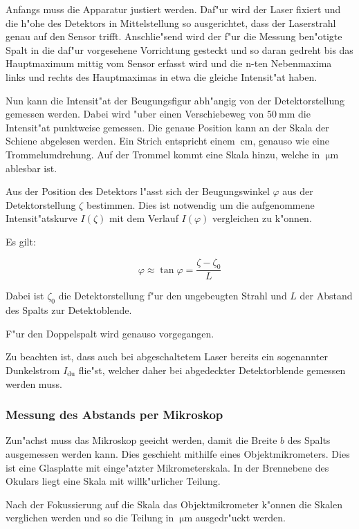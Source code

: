 			Anfangs muss die Apparatur justiert werden. Daf"ur wird der Laser fixiert und die h"ohe des Detektors in Mittelstellung so ausgerichtet, dass der Laserstrahl genau auf den Sensor trifft. Anschlie"send wird der f"ur die Messung ben"otigte Spalt in die daf"ur vorgesehene Vorrichtung gesteckt und so daran gedreht bis das Hauptmaximum mittig vom Sensor erfasst wird und die n-ten Nebenmaxima links und rechts des Hauptmaximas in etwa die gleiche Intensit"at haben.

			Nun kann die Intensit"at der Beugungsfigur abh"angig von der Detektorstellung gemessen werden. Dabei wird "uber einen Verschiebeweg von $\SI{50}{\milli\meter}$ die Intensit"at punktweise gemessen. Die genaue Position kann an der Skala der Schiene abgelesen werden. Ein Strich entspricht einem $\SI{}{\centi \meter}$, genauso wie eine Trommelumdrehung. Auf der Trommel kommt eine Skala hinzu, welche in $\SI{}{\micro \meter}$ ablesbar ist.

			Aus der Position des Detektors l"asst sich der Beugungswinkel $\varphi$ aus der Detektorstellung $\zeta$ bestimmen. Dies ist notwendig um die aufgenommene Intensit"atskurve $I(\zeta)$ mit dem Verlauf $I(\varphi)$ vergleichen zu k"onnen.

			Es gilt:

			\begin{equation}
				\varphi \approx \tan{\varphi} = \frac{\zeta - \zeta_0}{L}
			\end{equation}

			Dabei ist $\zeta_0$ die Detektorstellung f"ur den ungebeugten Strahl und $L$ der Abstand des Spalts zur Detektoblende.

			F"ur den Doppelspalt wird genauso vorgegangen.

			Zu beachten ist, dass auch bei abgeschaltetem Laser bereits ein sogenannter Dunkelstrom $I_{\text{du}}$ flie"st, welcher daher bei abgedeckter Detektorblende gemessen werden muss.

		\subsubsection{Messung des Abstands per Mikroskop}
			\label{sec:messung_mikro}

			Zun"achst muss das Mikroskop geeicht werden, damit die Breite $b$ des Spalts ausgemessen werden kann. Dies geschieht mithilfe eines Objektmikrometers. Dies ist eine Glasplatte mit einge"atzter Mikrometerskala. In der Brennebene des Okulars liegt eine Skala mit willk"urlicher Teilung. 

			Nach der Fokussierung auf die Skala das Objektmikrometer k"onnen die Skalen verglichen werden und so die Teilung in $\SI{}{\micro \meter}$ ausgedr"uckt werden.
